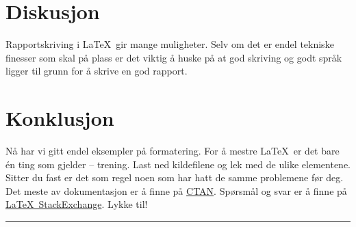 \section{Diskusjon}
Rapportskriving i \LaTeX\ gir mange muligheter. Selv om det er endel tekniske finesser som skal på plass er det viktig å huske på at god skriving og godt språk ligger til grunn for å skrive en god rapport. 

\section{Konklusjon}
Nå har vi gitt endel eksempler på formatering. For å mestre \LaTeX\ er det bare én ting som gjelder -- trening. Last ned kildefilene og lek med de ulike elementene. Sitter du fast er det som regel noen som har hatt de samme problemene før deg. Det meste av dokumentasjon er å finne på \href{http://www.ctan.org/}{CTAN}. Spørsmål og svar er å finne på \href{http://tex.stackexchange.com/}{\LaTeX\ StackExchange}. Lykke til!

\begingroup
\begin{center}
\rule{2cm}{.4pt} %
\end{center}
\makeatletter
{} %
\makeatother


\endgroup


